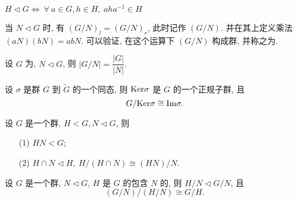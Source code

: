 \begin{proposition}
	$H\lhd G\Leftrightarrow\ \forall\ a\in G,h\in H,\ aha^{-1}\in H$
\end{proposition}

\begin{definition}
	当 $N\lhd G$ 时, 有 $(G/N)_l=(G/N)_r$, 此时记作 $(G/N)$. 并在其上定义乘法 $(aN)(bN)=abN$. 可以验证, 在这个运算下 $(G/N)$ 构成群, 并称之为.
\end{definition}

\begin{proposition}
	设 $G$ 为, $N\lhd G$, 则 $|G/N|=\dfrac{|G|}{|N|}.$
\end{proposition}

\begin{theorem}[群同态基本定理]
	设 $\sigma$ 是群 $G$ 到 $\widetilde{G}$ 的一个同态, 则 $\text {Ker}\sigma$ 是 $G$ 的一个正规子群, 且 $$G/\text {Ker}\sigma\cong\text {Im}\sigma.$$
\end{theorem}

\begin{theorem}[第一群同构定理]
	设 $G$ 是一个群, $H<G,N\lhd G$, 则 
	\begin{itemize}
		\item[(1)] $HN<G$;
		\item[(2)] $H\cap N\lhd H,\ H/(H\cap N)\cong (HN)/N$.
	\end{itemize}
\end{theorem}

\begin{theorem}[第二群同构定理]
	设 $G$ 是一个群, $N\lhd G$, $H$ 是 $G$ 的包含 $N$ 的, 则 $H/N\lhd G/N$, 且 $$(G/N)/(H/N)\cong G/H.$$
\end{theorem}
